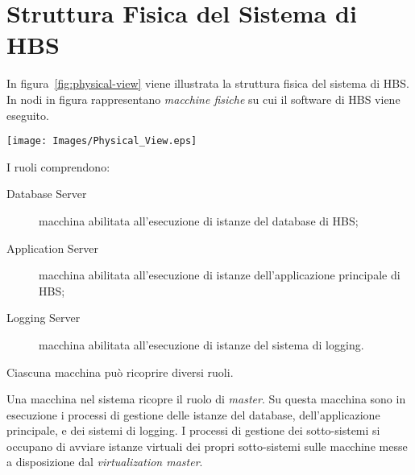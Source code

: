 
\section{Struttura Fisica del Sistema di HBS}

In figura~\ref{fig:physical-view} viene illustrata la struttura fisica del sistema di HBS.
In nodi in figura rappresentano \emph{macchine fisiche} su cui il software di HBS viene eseguito.

\begin{figure*}[h]
	\centering
	\texttt{[image: Images/Physical\_View.eps]}
	\caption{Diagramma di deployment del sistema.}
	\label{fig:physical-view}
\end{figure*}

I ruoli comprendono:
\begin{description}
	\item[Database Server] macchina abilitata all'esecuzione di istanze del database di HBS;

	\item[Application Server] macchina abilitata all'esecuzione di istanze dell'applicazione principale di HBS;

	\item[Logging Server] macchina abilitata all'esecuzione di istanze del sistema di logging.
\end{description}
Ciascuna macchina pu\`o ricoprire diversi ruoli.

Una macchina nel sistema ricopre il ruolo di \emph{master}.
Su questa macchina sono in esecuzione i processi di gestione delle istanze del database, dell'applicazione principale, e dei sistemi di logging.
I processi di gestione dei sotto-sistemi si occupano di avviare istanze virtuali dei propri sotto-sistemi sulle macchine messe a disposizione dal \emph{virtualization master}.
